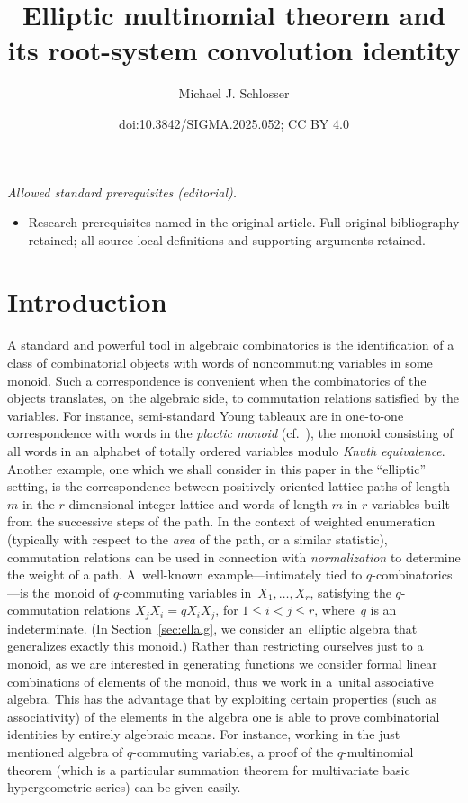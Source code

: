 \documentclass[10pt,a4paper]{amsart}
\title{Elliptic multinomial theorem and its root-system convolution identity}
\author{Michael J. Schlosser}
\date{doi:10.3842/SIGMA.2025.052; CC BY 4.0}
\numberwithin{equation}{section}
\theoremstyle{definition}
\begin{document}
\maketitle
\noindent\textit{Allowed standard prerequisites (editorial).}\begin{itemize}
\item Research prerequisites named in the original article. Full original bibliography retained; all source-local definitions and supporting arguments retained.
\end{itemize}\medskip
\section{Introduction}\label{sec:intro}
A standard and powerful tool in algebraic combinatorics
is the identification of a class of combinatorial objects with
words of noncommuting variables in some monoid.
Such a correspondence is convenient when
the combinatorics of the objects translates, on the algebraic
side, to commutation relations satisfied by the variables.
For instance, semi-standard Young tableaux are in
one-to-one correspondence with words in the \textit{plactic monoid}
(cf.\ \cite{LS}), the monoid consisting of all words
in an alphabet of totally ordered variables modulo
\textit{Knuth equivalence}. Another example, one which we
shall consider in this paper in the ``elliptic'' setting, is the
correspondence between positively oriented lattice paths
of length $m$ in the $r$-dimensional integer lattice and words
of length $m$ in $r$ variables built from the successive
steps of the path. In the context of weighted enumeration
(typically with respect to the \textit{area} of the path,
or a similar statistic),
commutation relations can be used in connection with
\textit{normalization} to determine the weight of a path.
A~well-known example---intimately tied to
$q$-combinatorics---is the monoid of $q$-commuting
variables in~${X_1,\dots,X_r}$, satisfying the
$q$-commutation relations $X_jX_i=qX_iX_j$, for
$1\le i<j\le r$, where~$q$ is an indeterminate.
(In Section~\ref{sec:ellalg}, we consider an~elliptic
algebra that generalizes exactly this monoid.)
Rather than restricting ourselves just to a monoid,
as we are interested in generating functions
we consider formal linear combinations of
elements of the monoid, thus we work in a~unital
associative algebra. %
This has the advantage that by exploiting certain
properties (such as associativity) of the elements
in the algebra one is able to prove %
combinatorial identities
by entirely algebraic means.
For instance, working in the just mentioned
algebra of $q$-commuting variables,
a proof of the $q$-multinomial theorem
(which is a particular summation theorem for
multivariate basic hypergeometric series)
can be given easily.
\end{document}
